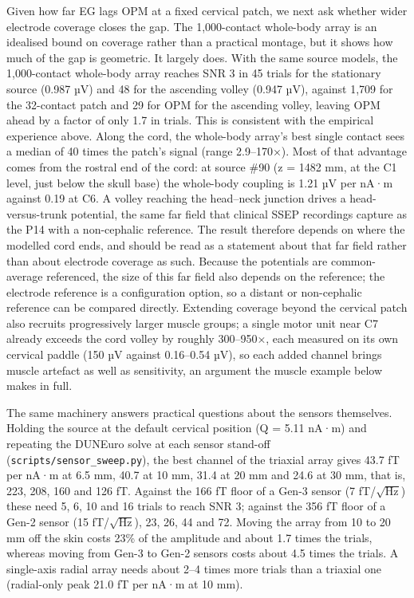 \documentclass[11pt]{article}
\newcommand{\revised}[1]{#1}
\begin{document}
\revised{Given how far EG lags OPM at a fixed cervical patch, we next ask whether
wider electrode coverage closes the gap. The 1,000-contact whole-body
array is an idealised bound on coverage rather than a practical montage,
but it shows how much of the gap is geometric. It largely does. With the same
source models, the 1,000-contact whole-body array reaches SNR 3 in 45
trials for the stationary source (0.987 µV) and 48 for the ascending
volley (0.947 µV), against 1,709 for the 32-contact patch and 29 for
OPM for the ascending volley, leaving OPM ahead by a factor of only 1.7 in trials. This is
consistent with the empirical experience above. Along the cord, the
whole-body array's best single contact sees a median of 40 times the
patch's signal (range 2.9--170×). Most of that advantage comes from the
rostral end of the cord: at source \#90 (z = 1482 mm, at the C1 level, just below the skull base)
the whole-body coupling is 1.21 µV per nA·m against 0.19 at C6. A volley
reaching the head--neck junction drives a head-versus-trunk potential,
the same far field that clinical SSEP recordings capture as the P14 with
a non-cephalic reference. The result therefore depends on where the
modelled cord ends, and should be read as a statement about that far
field rather than about electrode coverage as such. Because the
potentials are common-average referenced, the size of this far field
also depends on the reference; the electrode reference is a
configuration option, so a distant or non-cephalic reference can be
compared directly.} \revised{Extending coverage beyond the cervical patch also recruits
progressively larger muscle groups; a single motor unit near C7 already
exceeds the cord volley by roughly 300--950×, each measured on its own cervical
paddle (150
µV against 0.16--0.54 µV), so each added channel brings muscle artefact
as well as sensitivity, an argument the muscle example below makes in
full.}

\revised{The same machinery answers practical questions about the sensors
themselves. Holding the source at the default cervical position
(Q = 5.11 nA·m) and repeating the DUNEuro solve at each sensor
stand-off (\texttt{scripts/sensor\_sweep.py}), the best channel of the
triaxial array gives 43.7 fT per nA·m at 6.5 mm, 40.7 at 10 mm, 31.4 at
20 mm and 24.6 at 30 mm, that is, 223, 208, 160 and 126 fT. Against the
166 fT floor of a Gen-3 sensor (7 fT/\(\sqrt{\text{Hz}}\)) these need
5, 6, 10 and 16 trials to reach SNR 3; against the 356 fT floor of a
Gen-2 sensor (15 fT/\(\sqrt{\text{Hz}}\)), 23, 26, 44 and 72. Moving the
array from 10 to 20 mm off the skin costs 23\% of the amplitude and
about 1.7 times the trials, whereas moving from Gen-3 to Gen-2 sensors
costs about 4.5 times the trials. A single-axis radial array needs
about 2--4 times more trials than a triaxial one (radial-only peak 21.0
fT per nA·m at 10 mm).}
\end{document}
